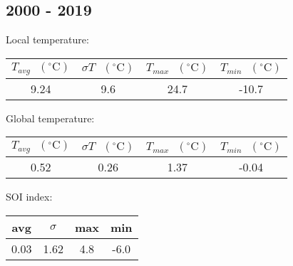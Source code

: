 \documentclass[12pt]{article}
\begin{document}
\subsection*{2000 - 2019}
Local temperature:
\begin{center}
\begin{tabular}{c | c | c | c}
	$T_{avg} \textrm{ } (^{\circ} \textrm{C})$ &
	$\sigma T \textrm{ } (^{\circ} \textrm{C})$ &
	$T_{max} \textrm{ } (^{\circ} \textrm{C})$ &
	$T_{min} \textrm{ } (^{\circ} \textrm{C})$ \\ %
	\hline
	9.24 & 9.6 & 24.7 & -10.7 \\ %
\end{tabular}
\end{center}
Global temperature:
\begin{center}
\begin{tabular}{c | c | c | c}
	$T_{avg} \textrm{ } (^{\circ} \textrm{C})$ &
	$\sigma T \textrm{ } (^{\circ} \textrm{C})$ &
	$T_{max} \textrm{ } (^{\circ} \textrm{C})$ &
	$T_{min} \textrm{ } (^{\circ} \textrm{C})$ \\ %
	\hline
	0.52 & 0.26 & 1.37 & -0.04 \\ %
\end{tabular}
\end{center}
SOI index:
\begin{center}
\begin{tabular}{c | c | c | c}
	avg & $\sigma$ & max & min \\ %
	\hline
	0.03 & 1.62 & 4.8 & -6.0 \\ %
\end{tabular}
\end{center}
\end{document}
